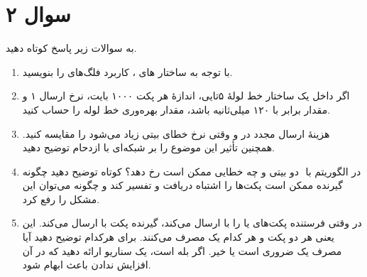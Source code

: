 \section*{سوال ۲}

به سوالات زیر پاسخ کوتاه دهید. 

\begin{enumerate}[label=\alph*)]

\item 
با توجه به ساختار های ، کاربرد فلگ‌های  را بنویسید.

\item 
اگر داخل یک ساختار خط لولهٔ ۵‌تایی، اندازهٔ هر پکت ۱۰۰۰ بایت، نرخ ارسال ۱  و مقدار  برابر با ۱۲۰ میلی‌ثانیه باشد، مقدار بهره‌وری خط لوله را حساب کنید.

\item 
هزینهٔ ارسال مجدد در  و  وقتی نرخ خطای بیتی زیاد می‌شود را مقایسه کنید. همچنین تأثیر این موضوع را بر  شبکه‌ای با ازدحام توضیح دهید. 

\item 
در الگوریتم  با ‌ دو بیتی و  چه خطایی ممکن است رخ دهد؟ کوتاه توضیح دهید چگونه گیرنده ممکن است پکت‌ها را اشتباه دریافت و تفسیر کند و چگونه می‌توان این مشکل را رفع کرد.

\item 
در  وقتی فرستنده پکت‌های  یا  را با  ارسال می‌کند، گیرنده پکت  با  ارسال می‌کند.  
این یعنی هر دو پکت  و  هر کدام یک  مصرف می‌کنند.  
برای هرکدام توضیح دهید آیا مصرف یک  ضروری است یا خیر. اگر بله است، یک سناریو ارائه دهید که در آن افزایش ندادن باعث ابهام شود.

\end{enumerate}